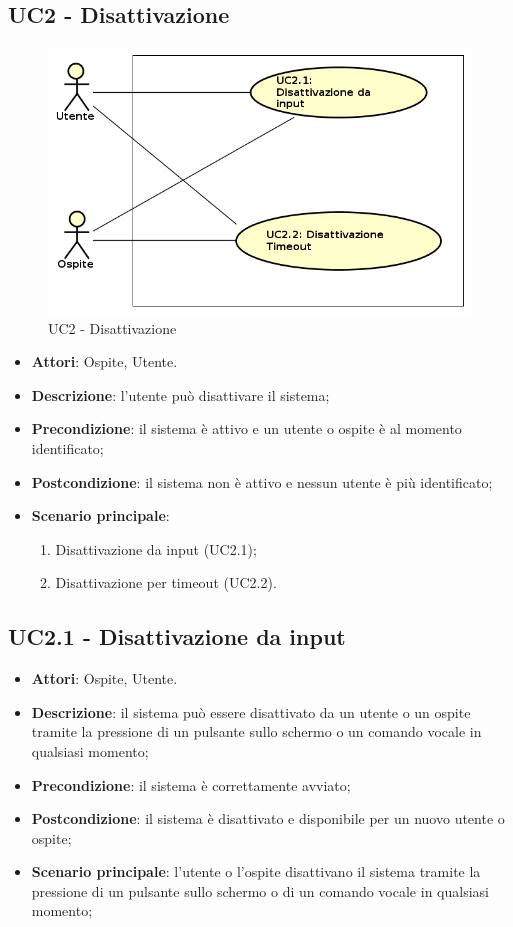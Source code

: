 \documentclass[../AnalisiDeiRequisiti_v3.0.0.tex]{subfiles}
\begin{document}
\subsection{UC2 - Disattivazione} 
\label{sssec:UC2}
\begin{figure}[!h]
	\centering
	\includegraphics[width=\textwidth]{UseCases/UC2_Disattivazione/UC2_Disattivazione.png}
	\caption{UC2 - Disattivazione}
\end{figure}
\begin{itemize} 
\item \textbf{Attori}: Ospite, Utente.
\item \textbf{Descrizione}: l'utente può disattivare il sistema;
\item \textbf{Precondizione}: il sistema è attivo e un utente o ospite è al momento identificato;
\item \textbf{Postcondizione}: il sistema non è attivo e nessun utente è più identificato;
\item \textbf{Scenario principale}: \begin{enumerate}\item Disattivazione da input (UC2.1);\item Disattivazione per timeout (UC2.2). 
 \end{enumerate}
\end{itemize} 
\subsection{UC2.1 - Disattivazione da input} 
\label{sssec:UC2.1} 
\begin{itemize} 
\item \textbf{Attori}: Ospite, Utente.
\item \textbf{Descrizione}: il sistema può essere disattivato da un utente o un ospite tramite la pressione di un pulsante sullo schermo o un comando vocale in qualsiasi momento;
\item \textbf{Precondizione}: il sistema è correttamente avviato;
\item \textbf{Postcondizione}: il sistema è disattivato e disponibile per un nuovo utente o ospite;
\item \textbf{Scenario principale}: l'utente o l'ospite disattivano il sistema tramite la pressione di un pulsante sullo schermo o di un comando vocale in qualsiasi momento;
\end{itemize} 
\end{document}
